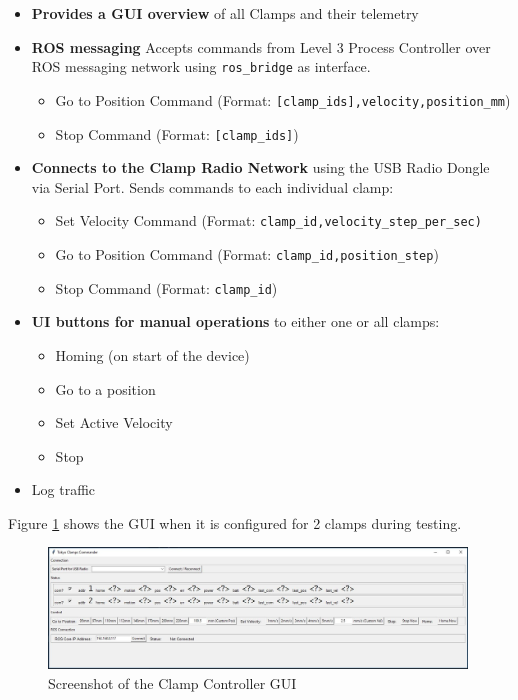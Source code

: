 \begin{itemize}[nosep]
    \item \textbf{Provides a GUI overview} of all Clamps and their telemetry
    \item \textbf{ROS messaging} Accepts commands from Level 3 Process Controller over ROS messaging network using \verb|ros_bridge| as interface.
    \begin{itemize}
        \item Go to Position Command (Format: \verb|[clamp_ids],velocity,position_mm|)
        \item Stop Command (Format: \verb|[clamp_ids]|)
    \end{itemize}
    \item \textbf{Connects to the Clamp Radio Network} using the USB Radio Dongle via Serial Port. Sends commands to each individual clamp:
    \begin{itemize}
        \item Set Velocity Command (Format: \verb|clamp_id,velocity_step_per_sec)|
        \item Go to Position Command (Format: \verb|clamp_id,position_step|)
        \item Stop Command (Format: \verb|clamp_id|)
    \end{itemize}
    \item \textbf{UI buttons for manual operations} to either one or all clamps:
    \begin{itemize}
        \item Homing (on start of the device)
        \item Go to a position
        \item Set Active Velocity
        \item Stop
    \end{itemize}
    \item Log traffic
\end{itemize}

Figure \ref{fig:screenshot-clamp-controller-gui} shows the GUI when it is configured for 2 clamps during testing. 

\begin{figure}
    \centering
    \includegraphics[width=0.99\textwidth]{images/05/image39.jpg}
    \caption{Screenshot of the Clamp Controller GUI}
    \label{fig:screenshot-clamp-controller-gui}
\end{figure}

